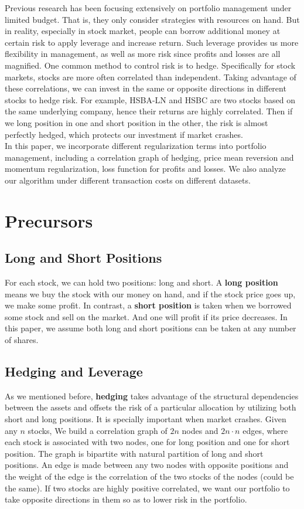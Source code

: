 \noindent Previous research \cite{johnson2015online,blum1999universal,kalai2003efficient} has been focusing extensively on portfolio management under limited budget. That is, they only consider strategies with resources on hand. But in reality, especially in stock market, people can borrow additional money at certain risk to apply leverage and increase return. Such leverage provides us more flexibility in management, as well as more risk since profits and losses are all magnified. One common method to control risk is to hedge. Specifically for stock markets, stocks are more often correlated than independent. Taking advantage of these correlations, we can invest in the same or opposite directions in different stocks to hedge risk. For example, HSBA-LN and HSBC are two stocks based on the same underlying company, hence their returns are highly correlated. Then if we long position in one and short position in the other, the risk is almost perfectly hedged, which protects our investment if market crashes.\\

\noindent In this paper, we incorporate different regularization terms into portfolio management, including a correlation graph of hedging, price mean reversion and momentum regularization, loss function for profits and losses. We also analyze our algorithm under different transaction costs on different datasets.

\section{Precursors}
\subsection{Long and Short Positions}
For each stock, we can hold two positions: long and short. A \textbf{long position} means we buy the stock with our money on hand, and if the stock price goes up, we make some profit. In contrast, a \textbf{short position} is taken when we borrowed some stock and sell on the market. And one will profit if its price decreases. In this paper, we assume both long and short positions can be taken at any number of shares.

\subsection{Hedging and Leverage}
As we mentioned before, \textbf{hedging} takes advantage of the structural dependencies between the assets and offsets the risk of a particular allocation by utilizing both short and long positions. It is specially important when market crashes. Given any $n$ stocks, We build a correlation graph of $2n$ nodes and $2n\cdot n$ edges, where each stock is associated with two nodes, one for long position and one for short position. The graph is bipartite with natural partition of long and short positions. An edge is made between any two nodes with opposite positions and the weight of the edge is the correlation of the two stocks of the nodes (could be the same). If two stocks are highly positive correlated, we want our portfolio to take opposite directions in them so as to lower risk in the portfolio.\\ 

